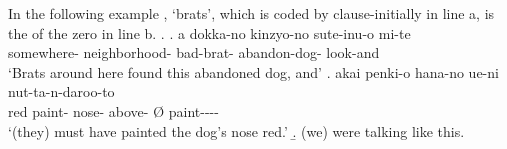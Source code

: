 In the following example \Next,
 `brats', which is coded by  clause-initially in line a, is the  of the zero in line b.
%
\ex.
 \ag. a dokka-no kinzyo-no  sute-inu-o mi-te \\
		 somewhere- neighborhood- bad-brat- abandon-dog- look-and \\
		`Brats around here found this abandoned dog, and'
 \bg. akai penki-o hana-no ue-ni \EM{\O} nut-ta-n-daroo-to \\
 	red paint- nose- above- {\O} paint---- \\
	`(they) must have painted the dog's nose red.'
 \b. (we) were talking like this.

